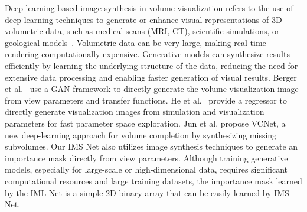 Deep learning-based image synthesis in volume visualization refers to the use of deep learning techniques to generate or enhance visual representations of 3D volumetric data, such as medical scans (MRI, CT), scientific simulations, or geological models~\cite{lochmann2016real}. Volumetric data can be very large, making real-time rendering computationally expensive. Generative models can synthesize results efficiently by learning the underlying structure of the data, reducing the need for extensive data processing and enabling faster generation of visual results. Berger et al.~\cite{8316963} use a GAN framework to directly generate the volume visualization image from view parameters and transfer functions. He et al.~\cite{8805426} provide a regressor to directly generate visualization images from simulation and visualization parameters for fast parameter space exploration. Jun et al. propose VCNet, a new deep-learning approach for volume completion by synthesizing missing subvolumes. Our IMS Net also utilizes image synthesis techniques to generate an importance mask directly from view parameters. Although training generative models, especially for large-scale or high-dimensional data, requires significant computational resources and large training datasets, the importance mask learned by the IML Net is a simple 2D binary array that can be easily learned by IMS Net. 


